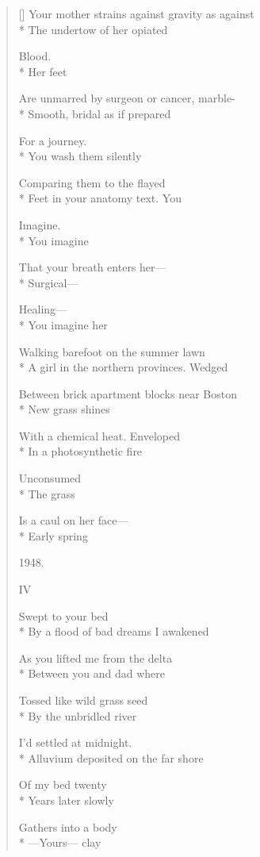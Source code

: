 \begin{verse}[\versewidth]
Your mother strains against gravity as against\\*
The undertow of her opiated

Blood.\\*
Her feet

Are unmarred by surgeon or cancer, marble-\\*
Smooth, bridal \qquad as if prepared

For a journey.\\*
You wash them \qquad silently

Comparing them to the flayed\\*
Feet in your anatomy text. \qquad  You

Imagine.\\*
You imagine

That your breath enters her---\\*
Surgical---

Healing---\\*
You imagine her

Walking barefoot on the summer lawn\\*
A girl in the northern provinces. \qquad Wedged

Between brick apartment blocks near Boston\\*
New grass shines


With a chemical heat.  Enveloped\\*
In a photosynthetic fire

Unconsumed\\*
The grass

Is a caul on her face---\\*
Early spring

1948.

\hspace{0.45\versewidth} IV

 \qquad  \qquad Swept to your bed\\*
By a flood of bad dreams   I awakened

As you lifted me from the delta\\*
Between you and dad \qquad  \qquad where

Tossed like wild grass seed\\*
By the unbridled river

I'd settled at midnight.\\*
Alluvium deposited on the far shore

Of my bed twenty\\*
Years later slowly

Gathers into a body\\*
---Yours--- \qquad clay


\end{verse}
